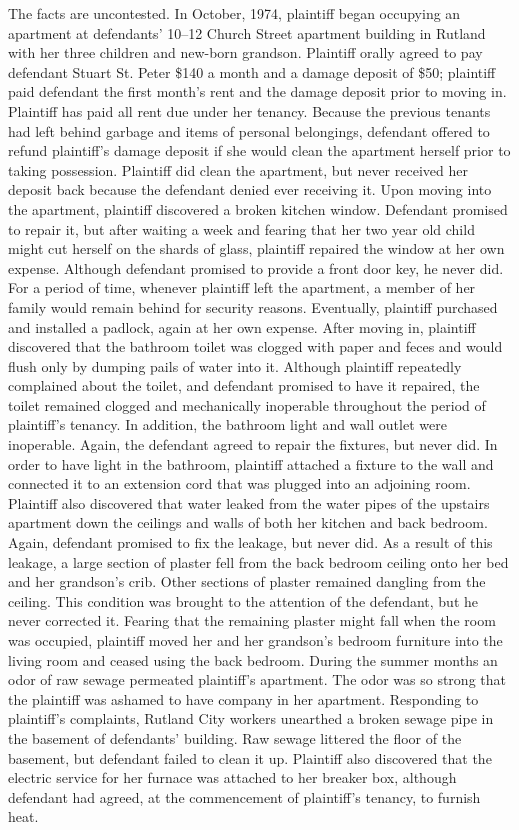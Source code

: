 The facts are uncontested. In October, 1974, plaintiff began occupying an
apartment at defendants' 10--12 Church Street apartment building in Rutland
with her three children and new-born grandson. Plaintiff orally agreed to pay
defendant Stuart St. Peter \$140 a month and a damage deposit of \$50;
plaintiff paid defendant the first month's rent and the damage deposit prior to
moving in. Plaintiff has paid all rent due under her tenancy. Because the
previous tenants had left behind garbage and items of personal belongings,
defendant offered to refund plaintiff's damage deposit if she would clean the
apartment herself prior to taking possession. Plaintiff did clean the
apartment, but never received her deposit back because the defendant denied
ever receiving it. Upon moving into the apartment, plaintiff discovered a
broken kitchen window. Defendant promised to repair it, but after waiting a
week and fearing that her two year old child might cut herself on the shards of
glass, plaintiff repaired the window at her own expense. Although defendant
promised to provide a front door key, he never did. For a period of time,
whenever plaintiff left the apartment, a member of her family would remain
behind for security reasons. Eventually, plaintiff purchased and installed a
padlock, again at her own expense. After moving in, plaintiff discovered that
the bathroom toilet was clogged with paper and feces and would flush only by
dumping pails of water into it. Although plaintiff repeatedly complained about
the toilet, and defendant promised to have it repaired, the toilet remained
clogged and mechanically inoperable throughout the period of plaintiff's
tenancy. In addition, the bathroom light and wall outlet were inoperable.
Again, the defendant agreed to repair the fixtures, but never did. In order to
have light in the bathroom, plaintiff attached a fixture to the wall and
connected it to an extension cord that was plugged into an adjoining room.
Plaintiff also discovered that water leaked from the water pipes of the
upstairs apartment down the ceilings and walls of both her kitchen and back
bedroom. Again, defendant promised to fix the leakage, but never did. As a
result of this leakage, a large section of plaster fell from the back bedroom
ceiling onto her bed and her grandson's crib. Other sections of plaster
remained dangling from the ceiling. This condition was brought to the attention
of the defendant, but he never corrected it. Fearing that the remaining plaster
might fall when the room was occupied, plaintiff moved her and her grandson's
bedroom furniture into the living room and ceased using the back bedroom.
During the summer months an odor of raw sewage permeated plaintiff's apartment.
The odor was so strong that the plaintiff was ashamed to have company in her
apartment. Responding to plaintiff's complaints, Rutland City workers unearthed
a broken sewage pipe in the basement of defendants' building. Raw sewage
littered the floor of the basement, but defendant failed to clean it up.
Plaintiff also discovered that the electric service for her furnace was
attached to her breaker box, although defendant had agreed, at the commencement
of plaintiff's tenancy, to furnish heat.

